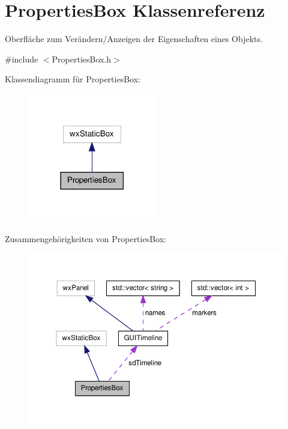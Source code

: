 \hypertarget{classPropertiesBox}{\section{Properties\-Box Klassenreferenz}
\label{classPropertiesBox}
}


Oberfläche zum Verändern/\-Anzeigen der Eigenschaften eines Objekts.  




{\ttfamily \#include $<$Properties\-Box.\-h$>$}



Klassendiagramm für Properties\-Box\-:\nopagebreak
\begin{figure}[H]
\begin{center}
\leavevmode
\includegraphics[width=158pt]{classPropertiesBox__inherit__graph}
\end{center}
\end{figure}


Zusammengehörigkeiten von Properties\-Box\-:\nopagebreak
\begin{figure}[H]
\begin{center}
\leavevmode
\includegraphics[width=350pt]{classPropertiesBox__coll__graph}
\end{center}
\end{figure}
